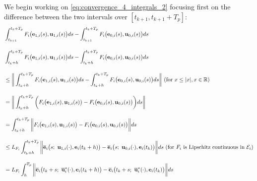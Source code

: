 We begin working on \eqref{eq:convergence_4_integrals_2} focusing
first on the difference between the two intervals over $[t_{k+1}, t_{k+1} + T_p]$:
\begin{align}
  &\int_{t_{k+1}}^{t_k + T_p} F_i \big(\vect{e}_{1,i}(s), \vect{u}_{1,i} (s)\big) d s
    - \int_{t_{k+1}}^{t_k + T_p} F_i \big(\vect{e}_{0,i}(s), \vect{u}_{0,i} (s)\big) d s \\[2.5ex]
  &\int_{t_k+h}^{t_k + T_p} F_i \big(\vect{e}_{1,i}(s), \vect{u}_{1,i} (s)\big) d s
    - \int_{t_k+h}^{t_k + T_p} F_i \big(\vect{e}_{0,i}(s), \vect{u}_{0,i} (s)\big) d s \\[2.5ex]
  & \leq \bigg\| \int_{t_k+h}^{t_k + T_p} F_i \big(\vect{e}_{1,i}(s), \vect{u}_{1,i} (s)\big) d s
    - \int_{t_k+h}^{t_k + T_p} F_i \big(\vect{e}_{0,i}(s), \vect{u}_{0,i} (s)\big) d s \bigg\|
    \text{ (for } x \leq |x|, x \in \mathbb{R} \text{)}\\[2.5ex]
  & = \bigg\| \int_{t_k+h}^{t_k + T_p} \bigg( F_i \big(\vect{e}_{1,i}(s), \vect{u}_{1,i} (s)\big)
    -  F_i \big(\vect{e}_{0,i}(s), \vect{u}_{0,i} (s)\big) \bigg) d s \bigg\| \\[2.5ex]
  & = \int_{t_k+h}^{t_k + T_p} \bigg\| F_i \big(\vect{e}_{1,i}(s), \vect{u}_{1,i} (s)\big)
    -  F_i \big(\vect{e}_{0,i}(s), \vect{u}_{0,i} (s)\big) \bigg\| d s \\[2.5ex]
  & \leq L_{F_i}\int_{t_k+h}^{t_k + T_p} \bigg\| \overline{\vect{e}}_i\big(s;\ \vect{u}_{1,i} (\cdot), \vect{e}_i(t_k + h) \big)
    -  \overline{\vect{e}}_i\big(s;\ \vect{u}_{0,i} (\cdot), \vect{e}_i(t_k)\big) \bigg\| d s
    \text{ (for } F_i \text{ is Lipschitz continuous in } \mathcal{E}_i \text{)}  \\[2.5ex]
    & = L_{F_i}\int_{h}^{T_p} \bigg\| \overline{\vect{e}}_i\big(t_k + s;\ \overline{\vect{u}}_i^{\star}(\cdot), \vect{e}_i(t_k + h) \big)
    -  \overline{\vect{e}}_i\big(t_k + s;\ \overline{\vect{u}}_i^{\star}(\cdot), \vect{e}_i(t_k)\big) \bigg\| d s
\label{eq:integrals_over_same_u_LV}
\end{align}


